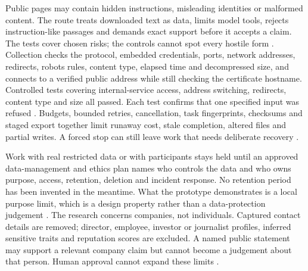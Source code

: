 Public pages may contain hidden instructions, misleading identities or malformed content. The route
treats downloaded text as data, limits model tools, rejects instruction-like passages and demands
exact support before it accepts a claim. The tests cover chosen risks; the controls cannot spot every
hostile form \citep{greshake2023indirect,autio2024genai}. Collection checks the protocol, embedded
credentials, ports, network addresses, redirects, robots rules, content type, elapsed time and
decompressed size, and connects to a verified public address while still checking the certificate
hostname. Controlled tests covering internal-service access, address switching, redirects, content
type and size all passed. Each test confirms that one specified input was refused
\citep{autio2024genai,nist2023airmf}. Budgets, bounded retries, cancellation, task fingerprints,
checksums and staged export together limit runaway cost, stale completion, altered files and partial
writes. A forced stop can still leave work that needs deliberate recovery
\citep{pineau2021reproducibility,nist2023airmf}.

Work with real restricted data or with participants stays held until an approved data-management and
ethics plan names who controls the data and who owns purpose, access, retention, deletion and incident
response. No retention period has been invented in the meantime. What the prototype demonstrates is a
local purpose limit, which is a design property rather than a data-protection judgement
\citep{nist2023airmf,cddo2023genai}. The research concerns companies, not individuals. Captured
contact details are removed; director, employee, investor or journalist profiles, inferred sensitive
traits and reputation scores are excluded. A named public statement may support a relevant company
claim but cannot become a judgement about that person. Human approval cannot expand these limits
\citep{cddo2023genai,nist2023airmf}.
